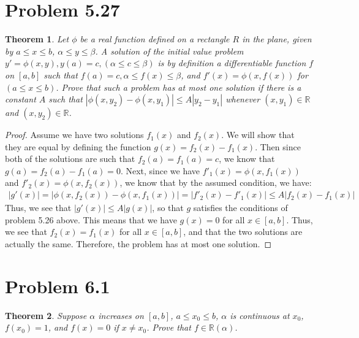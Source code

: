 \documentclass[psamsfonts]{amsart}
\newtheorem{thm}{Theorem}[section]
\theoremstyle{definition}
\theoremstyle{remark}
\numberwithin{equation}{section}
\begin{document}
\section{Problem 5.27}

\begin{thm}
Let $\phi$ be a real function defined on a rectangle $R$ in the plane, given by $a \leq x \leq b$, $\alpha \leq y \leq \beta$. A solution of the initial value problem $y' = \phi (x,y), y(a) = c, (\alpha \leq c \leq \beta)$ is by definition a differentiable function $f$ on $[a,b]$ such that $f(a) = c, \alpha \leq f(x) \leq \beta$, and $f'(x) = \phi(x,f(x))$ for $(a \leq x \leq b)$. Prove that such a  problem has at most one solution if there is a constant $A$ such that $|\phi(x,y_2) - \phi(x,y_1)| \leq A |y_2 - y_1|$ whenever $(x,y_1) \in \mathbb{R}$ and $(x, y_2) \in \mathbb{R}$.
\end{thm}

\begin{proof}
Assume we have two solutions $f_1(x)$ and $f_2(x)$. We will show that they are equal by defining the function $g(x) = f_2(x) - f_1(x)$. Then since both of the solutions are such that $f_2(a) = f_1(a) = c$, we know that $g(a) = f_2(a) - f_1(a) = 0$. Next, since we have $f'_1(x) = \phi(x, f_1(x))$ and $f'_2(x) = \phi(x,f_2(x))$, we know that by the assumed condition, we have:
\begin{eqnarray}
|g'(x)| = |\phi(x,f_2(x)) - \phi(x,f_1(x))| = |f'_2(x) - f'_1(x)| \leq A |f_2(x) - f_1(x)|
\end{eqnarray}
Thus, we see that $|g'(x)| \leq A |g(x)|$, so that $g$ satisfies the conditions of problem 5.26 above. This means that we have $g(x) = 0$ for all $x \in [a,b]$. Thus, we see that $f_2(x) = f_1(x)$ for all $x \in [a,b]$, and that the two solutions are actually the same. Therefore, the problem has at most one solution.
\end{proof}

\section{Problem 6.1}

\begin{thm}
Suppose $\alpha$ increases on $[a,b]$, $a \leq x_0 \leq b$, $\alpha$ is continuous at $x_0$, $f(x_0) = 1$, and $f(x) = 0$ if $x \neq x_0$. Prove that $f \in \mathbb{R}(\alpha)$. 
\end{thm}
\end{document}

